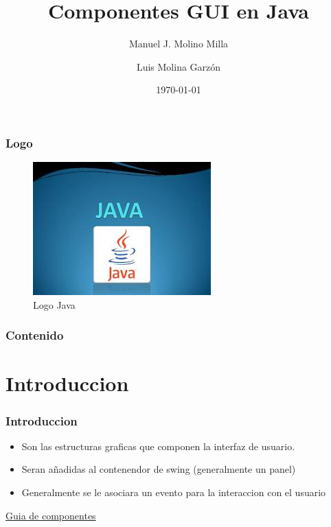 \documentclass{beamer}
\title{Componentes GUI en Java}
\author{Manuel J. Molino Milla \and Luis Molina Garzón}
\date{\today} %
\institute{IES Virgen del Carmen \and Departamento de Informática}
\begin{document}
\begin{frame}
  \titlepage
\end{frame}

\begin{frame}
    \frametitle{Logo}
\begin{figure}
\includegraphics[scale=1]{imagenes/logo.jpeg} 
\caption{Logo Java}
\end{figure}
\end{frame}

\begin{frame}
  \frametitle{Contenido}
  \tableofcontents[pausesections]
\end{frame}



\section{Introduccion}


\begin{frame}
\frametitle{Introduccion}
\begin{itemize}[<+->]
\item Son las estructuras graficas que componen la interfaz de usuario.
\item Seran añadidas al contenendor de swing (generalmente un panel)
\item Generalmente se le asociara un evento para la interaccion con el usuario
\end{itemize}
\pause
\begin{center}
{\color{blue} \href{http://web.mit.edu/6.005/www/sp14/psets/ps4/java-6-tutorial/components.html}{Guia de componentes}}
\end{center}
\end{frame}
\end{document}
